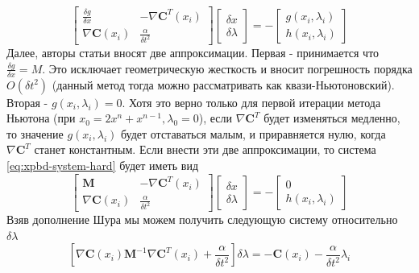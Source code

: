 \begin{equation} \label{eq:xpbd-system-hard}
	\left[
		\begin{array}{cc}
			\frac{\delta g}{\delta x} & -\nabla \textbf{C}^T(x_i)\\
			\nabla \textbf{C}(x_i) & \frac{\alpha}{\delta t^2}
		\end{array}
	\right]\left[
		\begin{array} {c}
			\delta x\\
			\delta \lambda
		\end{array}
	\right]	= -\left[
		\begin{array}{c}
			g(x_i, \lambda_i)\\
			h(x_i, \lambda_i)
		\end{array}
	\right]
\end{equation}
	Далее, авторы статьи вносят две аппроксимации. Первая - принимается что $\frac{\delta g}{\delta x} = M$. Это исключает геометрическую жесткость и вносит погрешность порядка $O(\delta t^2)$ (данный метод тогда можно рассматривать как квази-Ньютоновский). Вторая - $g(x_i, \lambda_i) = 0$. Хотя это верно только для первой итерации метода Ньютона (при $x_0 = 2x^n + x^{n-1}, \lambda_0 = 0$), если $\nabla \textbf{C}^T$ будет изменяться медленно, то значение $g(x_i, \lambda_i)$ будет отставаться малым, и приравняется нулю, когда $\nabla \textbf{C}^T$ станет константным. Если внести эти две аппроксимации, то система \ref{eq:xpbd-system-hard} будет иметь вид 
\begin{equation} \label{eq:xbd-system-hard}
	\left[
	\begin{array}{cc}
		\textbf{M} & -\nabla \textbf{C}^T(x_i)\\
		\nabla \textbf{C}(x_i) & \frac{\alpha}{\delta t^2}
	\end{array}
	\right]\left[
	\begin{array} {c}
		\delta x\\
		\delta \lambda
	\end{array}
	\right]	= -\left[
	\begin{array}{c}
		0\\
		h(x_i, \lambda_i)
	\end{array}
	\right]
\end{equation}
	Взяв дополнение Шура мы можем получить следующую систему относительно $\delta \lambda$
\begin{equation} \label{eq:xbd-delta-lambda}
	\left[\nabla \textbf{C}(x_i) \textbf{M}^{-1} \nabla \textbf{C}^T(x_i) + \frac{\alpha}{\delta t^2}\right]\delta \lambda = -\textbf{C}(x_i) - \frac{\alpha}{\delta t^2}\lambda_i
\end{equation}	

